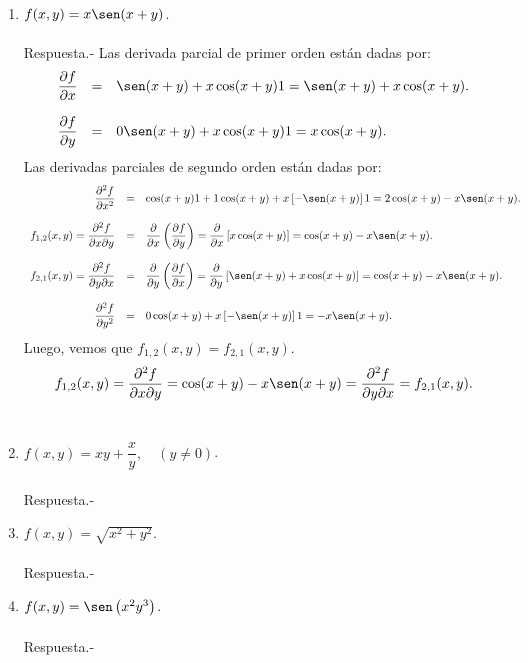 \begin{enumerate}[\bfseries 1.]
    \item $f(x,y)=x\sen(x+y)$.\\\\
	Respuesta.-\; Las derivada parcial de primer orden están dadas por:
	$$\begin{array}{rcl}
	    \dfrac{\partial f}{\partial x}&=&\sen(x+y)+x\cos(x+y)1=\sen(x+y)+x\cos(x+y).\\\\
	    \dfrac{\partial f}{\partial y}&=&0\sen(x+y)+x\cos(x+y)1=x\cos(x+y).
	\end{array}$$
	Las derivadas parciales de segundo orden están dadas por:
	$$\begin{array}{rcl}
	    \dfrac{\partial^2 f}{\partial x^2}&=&\cos(x+y)1+1\cos(x+y)+x\left[-\sen(x+y)\right]1=2\cos(x+y)-x\sen(x+y).\\\\
	    f_{1,2}(x,y)=\dfrac{\partial^2 f}{\partial x\partial y}&=&\dfrac{\partial}{\partial x}\left(\dfrac{\partial f}{\partial y}\right)=\dfrac{\partial}{\partial x}\left[x\cos(x+y)\right]=\cos(x+y)-x\sen(x+y).\\\\
	    f_{2,1}(x,y)=\dfrac{\partial^2 f}{\partial y\partial x}&=&\dfrac{\partial}{\partial y}\left(\dfrac{\partial f}{\partial x}\right)=\dfrac{\partial}{\partial y}\left[\sen(x+y)+x\cos(x+y)\right]=\cos(x+y)-x\sen(x+y).\\\\
	    \dfrac{\partial^2 f}{\partial y^2}&=&0\cos(x+y)+x\left[-\sen(x+y)\right]1=-x\sen(x+y).
	\end{array}$$
	Luego, vemos que $f_{1,2}(x,y)=f_{2,1}(x,y)$.
	$$f_{1,2}(x,y)=\dfrac{\partial^2f}{\partial x \partial y}=\cos(x+y)-x\sen(x+y)=\dfrac{\partial^2 f}{\partial y \partial x}=f_{2,1}(x,y).$$\\

    \item $f(x,y)=xy+\dfrac{x}{y},\quad (y\neq 0)$.\\\\
	Respuesta.-\;

    \item $f(x,y)=\sqrt{x^2+y^2}$.\\\\
	Respuesta.-\;

    \item $f(x,y)=\sen\left(x^2y^3\right)$.\\\\
	Respuesta.-\;


\end{enumerate}
